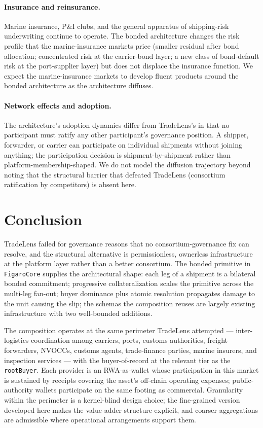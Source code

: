 \documentclass[11pt,a4paper]{article}
\theoremstyle{definition}
\theoremstyle{remark}
\begin{document}
\paragraph{Insurance and reinsurance.}
Marine insurance, P\&I clubs, and the general apparatus of
shipping-risk underwriting continue to operate. The bonded
architecture changes the risk profile that the marine-insurance
markets price (smaller residual after bond allocation;
concentrated risk at the carrier-bond layer; a new class of
bond-default risk at the port-supplier layer) but does not
displace the insurance function. We expect the marine-insurance
markets to develop fluent products around the bonded
architecture as the architecture diffuses.

\paragraph{Network effects and adoption.}
The architecture's adoption dynamics differ from TradeLens's in
that no participant must ratify any other participant's
governance position. A shipper, forwarder, or carrier can
participate on individual shipments without joining anything;
the participation decision is shipment-by-shipment rather than
platform-membership-shaped. We do not model the diffusion
trajectory beyond noting that the structural barrier that
defeated TradeLens (consortium ratification by competitors) is
absent here.

\section{Conclusion}
\label{sec:conclusion}

TradeLens failed for governance reasons that no
consortium-governance fix can resolve, and the structural
alternative is permissionless, ownerless infrastructure at the
platform layer rather than a better consortium. The bonded
primitive in \texttt{FigaroCore} supplies the architectural
shape: each leg of a shipment is a bilateral bonded commitment;
progressive collateralization scales the primitive across the
multi-leg fan-out; buyer dominance plus atomic resolution
propagates damage to the unit causing the slip; the schemas the
composition reuses are largely existing infrastructure with two
well-bounded additions.

The composition operates at the same perimeter TradeLens attempted
--- inter-logistics coordination among carriers, ports, customs
authorities, freight forwarders, NVOCCs, customs agents,
trade-finance parties, marine insurers, and inspection services
--- with the buyer-of-record at the relevant tier as the
\texttt{rootBuyer}. Each provider is an RWA-as-wallet whose
participation in this market is sustained by receipts covering
the asset's off-chain operating expenses; public-authority
wallets participate on the same footing as commercial.
Granularity within the perimeter is a kernel-blind design choice;
the fine-grained version developed here makes the value-adder
structure explicit, and coarser aggregations are admissible
where operational arrangements support them.
\end{document}
